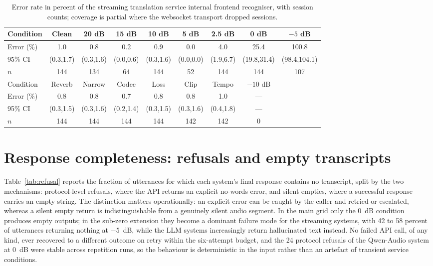 \documentclass[11pt]{article}
\begin{document}
\begin{table}[h]
\centering
\caption{Error rate in percent of the streaming translation service
internal frontend recogniser, with session counts; coverage is partial
where the websocket transport dropped sessions.}
\label{tab:ltfrontend}
\footnotesize
\setlength{\tabcolsep}{2.6pt}
\begin{tabular}{lcccccccc}
\toprule
Condition & Clean & 20 dB & 15 dB & 10 dB & 5 dB & 2.5 dB & 0 dB & $-5$ dB \\
\midrule
Error (\%) & 1.0 & 0.8 & 0.2 & 0.9 & 0.0 & 4.0 & 25.4 & 100.8 \\
95\% CI & (0.3,1.7) & (0.3,1.6) & (0.0,0.6) & (0.3,1.6) & (0.0,0.0) & (1.9,6.7) & (19.8,31.4) & (98.4,104.1) \\
$n$ & 144 & 134 & 64 & 144 & 52 & 144 & 144 & 107 \\
\midrule
Condition & Reverb & Narrow & Codec & Loss & Clip & Tempo & $-10$ dB & \\
\midrule
Error (\%) & 0.8 & 0.8 & 0.7 & 0.8 & 0.8 & 1.0 & --- & \\
95\% CI & (0.3,1.5) & (0.3,1.6) & (0.2,1.4) & (0.3,1.5) & (0.3,1.6) & (0.4,1.8) & --- & \\
$n$ & 144 & 144 & 144 & 144 & 142 & 142 & 0 & \\
\bottomrule
\end{tabular}
\end{table}

\section{Response completeness: refusals and empty transcripts}
\label{supp:refusal}

Table~\ref{tab:refusal} reports the fraction of utterances for which each
system's final response contains no transcript, split by the two
mechanisms: protocol-level refusals, where the API returns an explicit
no-words error, and silent empties, where a successful response carries an
empty string. The distinction matters operationally: an explicit error can
be caught by the caller and retried or escalated, whereas a silent empty
return is indistinguishable from a genuinely silent audio segment. In the
main grid only the 0~dB condition produces empty outputs; in the sub-zero
extension they become a dominant failure mode for the streaming systems,
with 42 to 58 percent of utterances returning nothing at $-5$~dB, while
the LLM systems increasingly return hallucinated text instead. No failed
API call, of any kind, ever recovered to a different outcome on retry
within the six-attempt budget, and the 24 protocol refusals of the
Qwen-Audio system at 0~dB were stable across repetition runs, so the
behaviour is deterministic in the input rather than an artefact of
transient service conditions.
\end{document}
